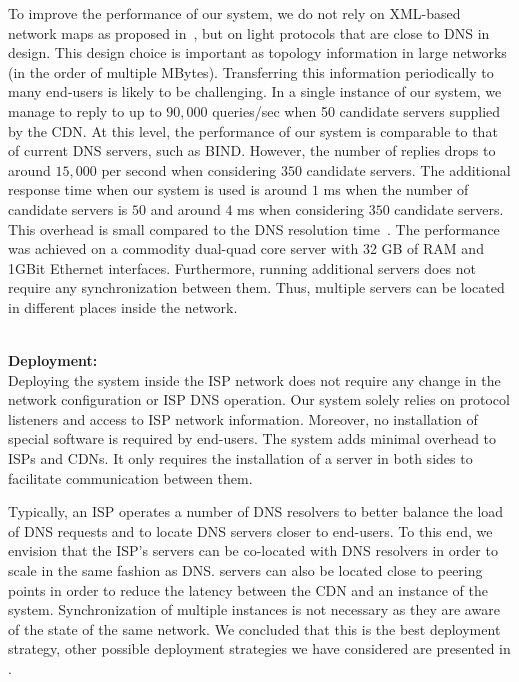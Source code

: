 To improve the performance of our system, we do not rely on XML-based network
maps as proposed in~\cite{ietf-alto-protocol}, but on light protocols that are
close to DNS in design.  This design choice is important as topology
information in large networks (in the order of multiple MBytes). Transferring
this information periodically to many end-users is likely to be challenging. In
a single instance of our system, we manage to reply to up to $90,000$
queries/sec when 50 candidate servers supplied by the CDN. At this level, the
performance of our system is comparable to that of current DNS servers, such as
BIND. However, the number of replies drops to around $15,000$ per second when
considering $350$ candidate servers. The additional response time when our
system is used is around $1$ ms when the number of candidate servers is $50$
and around $4$ ms when considering $350$ candidate servers. This overhead is
small compared to the DNS resolution time~\cite{DNS-IMC-2010}. The performance
was achieved on a commodity dual-quad core server with 32 GB of RAM and 1GBit
Ethernet interfaces. Furthermore, running additional servers does not require
any synchronization between them.  Thus, multiple servers can be located in
different places inside the network.


\ \\\noindent\textbf{Deployment:}\label{sec:deployment:}\\\noindent
Deploying the system inside the ISP network does not require any change in the
network configuration or ISP DNS operation.  Our system solely relies on
protocol listeners and access to ISP network information. Moreover, no
installation of special software is required by end-users.  The \cate system
adds minimal overhead to ISPs and CDNs.  It only requires the installation of a
server in both sides to facilitate communication between them.

Typically, an ISP operates a number of DNS resolvers to better balance the load
of DNS requests and to locate DNS servers closer to end-users. To this end, we
envision that the ISP's \cate servers can be co-located with DNS resolvers in
order to scale in the same fashion as DNS.  \cate servers can also be located
close to peering points in order to reduce the latency between the CDN and an
instance of the system. Synchronization of multiple \cate instances is not
necessary as they are aware of the state of the same network.  We concluded
that this is the best deployment strategy, other possible deployment strategies
we have considered are presented in \cite{CaTE-TR}.


